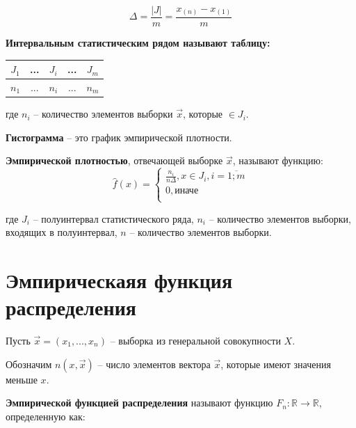 \documentclass[12pt]{report}
\begin{document}
\begin{equation}
    \Delta = \frac{|J|}{m} = \frac{x_{(n)} - x_{(1)}}{m}
\end{equation}

\newpage

\textbf{Интервальным статистическим рядом называют таблицу:}

\begin{table}[htb]
    \centering
    \begin{tabular}{|c|c|c|c|c|}
        \hline
        $J_1$ & ... & $J_i$ & ... & $J_m$ \\
        \hline
        $n_1$ & ... & $n_i$ & ... & $n_m$ \\
        \hline
    \end{tabular}
\end{table}

где $n_i$ -- количество элементов выборки $\vec x$, которые $\in J_i$.


\textbf{Гистограмма} -- это график эмпирической плотности. 

\textbf{Эмпирической плотностью}, отвечающей выборке $\vec x$, называют функцию:
\begin{equation}
    \hat f(x) =
    \begin{cases}
        \frac{n_i}{n \Delta}, x \in J_i, i = \overline{1; m} \\
        0, \text{иначе} \\
    \end{cases}
\end{equation}

где $J_i$ -- полуинтервал статистического ряда, 
$n_i$ -- количество элементов выборки, входящих в полуинтервал, 
$n$ -- количество элементов выборки.


\section{Эмпирическаяя функция распределения}

Пусть $\vec x = (x_1, ..., x_n)$ -- выборка из генеральной совокупности $X$. 

Обозначим $n(x, \vec x)$ -- число элементов вектора $\vec x$, которые имеют значения меньше $x$.

\textbf{Эмпирической функцией распределения} называют функцию $F_n: \mathbb{R} \to \mathbb{R}$, определенную как: 
\end{document}
